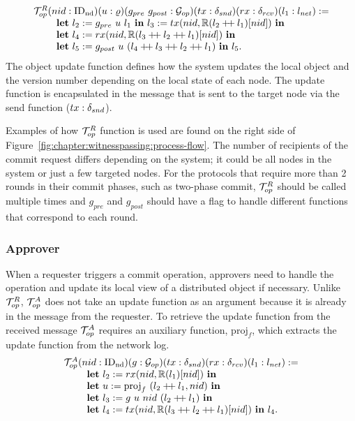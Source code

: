$$
\begin{array}{l}
\opfunction (nid: \nodeid) (u : \updatefunc) (g_{pre}\ g_{post}:  \gopfunction)
	(tx: \sendfunction)
	(rx: \recvfunction)
	(l_1  :\networklog ) := \\
\ \ \ \ \ \ \ \mbox{\textbf{let}} \ l_2 := g_{pre}\ u \ l_1  \ \mbox{\textbf{in}}\   l_3 := tx(nid, \replay(l_2 \mdoubleplus l_1)[nid]) \ \mbox{\textbf{in}}  \\
\ \ \ \ \ \ \ \mbox{\textbf{let}} \ l_4 := rx(nid, \replay(l_3 \mdoubleplus l_2 \mdoubleplus l_1)[nid]) \
	\mbox{\textbf{in}} \\
\ \ \ \ \ \ \ \mbox{\textbf{let}} \ l_5 := 	 g_{post}\  u \ (l_4 \mdoubleplus l_3 \mdoubleplus l_2 \mdoubleplus l_1) \ \mbox{\textbf{in}}\ l_5.
\end{array}
$$
The object update function defines how the system updates the local object and
the version number depending on the local state of each node.
The update function is encapsulated in the message that is sent to the target node
via the send function ($tx : \delta_{snd}$).

Examples of how $\mathcal{T}^{R}_{op}$ function is used are found on the right side
of Figure~\ref{fig:chapter:witnesspassing:process-flow}. The number of recipients of the commit request differs depending
on the system; it could be all nodes in the system or just a few targeted nodes.
For the protocols that require more than 2 rounds in their commit phases, such as 
two-phase commit, $\mathcal{T}^{R}_{op}$ should be called multiple times and $g_{pre}$ and
$g_{post}$ should have a flag to handle different functions that correspond to
each round. 

\subsubsection{Approver}
When a requester triggers a commit operation,  approvers need to
handle the operation and update its local view of a distributed object if
necessary. Unlike $\mathcal{T}^{R}_{op}$, $\mathcal{T}^{A}_{op}$ does not take an update function as an argument
because it is already in the message from the requester.
To retrieve the update function from the received message $\mathcal{T}^{A}_{op}$ requires
an auxiliary function, $\mathrm{proj}_{f}$, which extracts the update function from the network log.
$$
\begin{array}{l}
	\mathcal{T}^{A}_{op} (nid: \mathrm{ID_{nd}}) (g:  \mathcal{G}_{op})
	(tx: \delta_{snd})(rx: \delta_{rcv})(l_1  :{l_{net}} ) := \\
\ \ \ \ \ \ \ \mbox{\textbf{let}} \ l_2 := rx(nid, \mathbb{R}(l_1)[nid]) \
  \mbox{\textbf{in}} \\
\ \ \ \ \ \ \ \mbox{\textbf{let}} \ u := \mathrm{proj}_{f} \ (l_2 \mathbin{+\mkern-4mu+} l_1, nid) \
  \mbox{\textbf{in}} \\
\ \ \ \ \ \ \ \mbox{\textbf{let}}\ l_3  := g\ u\ nid \ (l_2 \mathbin{+\mkern-4mu+} l_1) \ \mbox{\textbf{in}} \\
\ \ \ \ \ \ \ \mbox{\textbf{let}} \ l_4 := tx(nid, \mathbb{R}(l_3 \mathbin{+\mkern-4mu+} l_2 \mathbin{+\mkern-4mu+} l_1)[nid]) \ \mbox{\textbf{in}}  \ l_4.
   \\
\end{array}
$$

